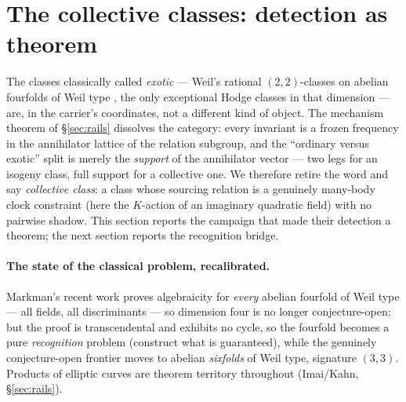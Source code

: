 \documentclass[11pt]{article}
\theoremstyle{definition}
\theoremstyle{remark}
\begin{document}
\section{The collective classes: detection as theorem}\label{sec:collective}

The classes classically called \emph{exotic} --- Weil's rational
$(2,2)$-classes on abelian fourfolds of Weil type \cite{Weil77}, the only
exceptional Hodge classes in that dimension \cite{MoonenZarhin} --- are, in
the carrier's coordinates, not a different kind of object. The mechanism
theorem of \S\ref{sec:rails} dissolves the category: every invariant is a
frozen frequency in the annihilator lattice of the relation subgroup, and
the ``ordinary versus exotic'' split is merely the \emph{support} of the
annihilator vector --- two legs for an isogeny class, full support for a
collective one. We therefore retire the word and say \emph{collective
class}: a class whose sourcing relation is a genuinely many-body clock
constraint (here the $K$-action of an imaginary quadratic field) with no
pairwise shadow. This section reports the campaign that made their
detection a theorem; the next section reports the recognition bridge.

\paragraph{The state of the classical problem, recalibrated.} Markman's
recent work proves algebraicity for \emph{every} abelian fourfold of Weil
type --- all fields, all discriminants \cite{Markman} --- so dimension four
is no longer conjecture-open; but the proof is transcendental and exhibits
no cycle, so the fourfold becomes a pure \emph{recognition} problem
(construct what is guaranteed), while the genuinely conjecture-open
frontier moves to abelian \emph{sixfolds} of Weil type, signature $(3,3)$.
Products of elliptic curves are theorem territory throughout (Imai/Kahn,
\S\ref{sec:rails}).
\end{document}
